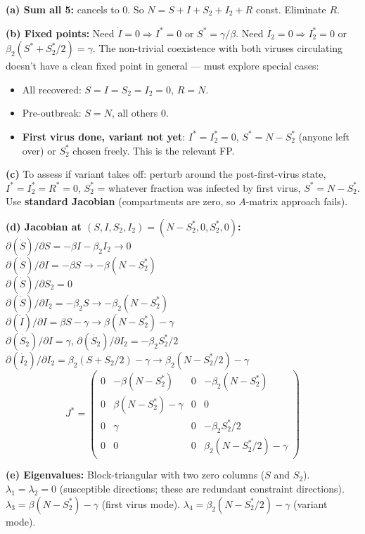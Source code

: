\documentclass[10pt]{article}
\begin{document}
\begin{solution}
\textbf{(a) Sum all 5:} cancels to 0. So $N = S + I + S_2 + I_2 + R$ const. Eliminate $R$.

\textbf{(b) Fixed points:} Need $\dot I = 0 \Rightarrow I^* = 0$ or $S^* = \gamma/\beta$. Need $\dot{I_2} = 0 \Rightarrow I_2^* = 0$ or $\beta_2(S^* + S_2^*/2) = \gamma$. The non-trivial coexistence with both viruses circulating doesn't have a clean fixed point in general — must explore special cases:
\begin{itemize}
\item All recovered: $S=I=S_2=I_2=0$, $R=N$.
\item Pre-outbreak: $S=N$, all others 0.
\item \textbf{First virus done, variant not yet}: $I^* = I_2^* = 0$, $S^* = N - S_2^*$ (anyone left over) or $S_2^*$ chosen freely. This is the relevant FP.
\end{itemize}

\textbf{(c)} To assess if variant takes off: perturb around the post-first-virus state, $I^* = I_2^* = R^* = 0$, $S_2^*$ = whatever fraction was infected by first virus, $S^* = N - S_2^*$. Use \textbf{standard Jacobian} (compartments are zero, so $A$-matrix approach fails).

\textbf{(d) Jacobian at $(S, I, S_2, I_2) = (N - S_2^*, 0, S_2^*, 0)$:}
$\partial(\dot S)/\partial S = -\beta I - \beta_2 I_2 \to 0$\\
$\partial(\dot S)/\partial I = -\beta S \to -\beta(N - S_2^*)$\\
$\partial(\dot S)/\partial S_2 = 0$\\
$\partial(\dot S)/\partial I_2 = -\beta_2 S \to -\beta_2(N - S_2^*)$\\
$\partial(\dot I)/\partial I = \beta S - \gamma \to \beta(N-S_2^*) - \gamma$\\
$\partial(\dot{S_2})/\partial I = \gamma$, $\partial(\dot{S_2})/\partial I_2 = -\beta_2 S_2^*/2$\\
$\partial(\dot{I_2})/\partial I_2 = \beta_2(S + S_2/2) - \gamma \to \beta_2(N - S_2^*/2) - \gamma$
\[
J^* = \begin{pmatrix} 0 & -\beta(N-S_2^*) & 0 & -\beta_2(N-S_2^*) \\ 0 & \beta(N-S_2^*)-\gamma & 0 & 0 \\ 0 & \gamma & 0 & -\beta_2 S_2^*/2 \\ 0 & 0 & 0 & \beta_2(N-S_2^*/2)-\gamma \end{pmatrix}
\]

\textbf{(e) Eigenvalues:} Block-triangular with two zero columns ($S$ and $S_2$).
$\lambda_1 = \lambda_2 = 0$ (susceptible directions; these are redundant constraint directions).
$\lambda_3 = \beta(N-S_2^*) - \gamma$ (first virus mode).
$\lambda_4 = \beta_2(N-S_2^*/2) - \gamma$ (variant mode).


\end{solution}
\end{document}
